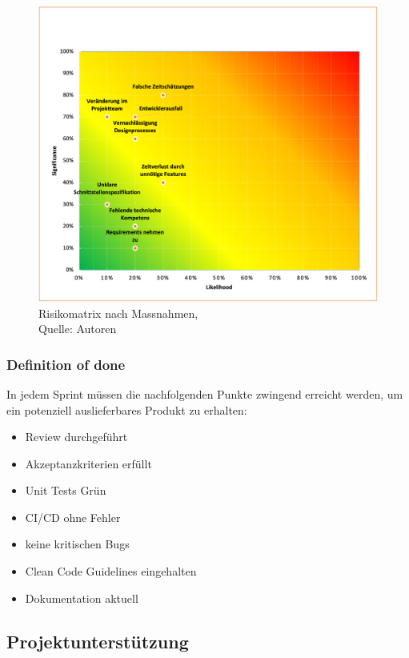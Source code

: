 \begin{figure}[H]
    \centering
   \includegraphics[width=1\textwidth]{images/RiskMap_naher.png}
    \caption[RisikomatrixNach]{Risikomatrix nach Massnahmen,\\ Quelle: Autoren}
    \label{img: RisikomatrixNachher}
\end{figure}

\subsubsection{Definition of done}
In jedem Sprint müssen die nachfolgenden Punkte zwingend erreicht werden, um ein potenziell auslieferbares Produkt zu erhalten:

\begin{itemize}
\item Review durchgeführt
\item Akzeptanzkriterien erfüllt
\item Unit Tests Grün
\item CI/CD ohne Fehler
\item keine kritischen Bugs
\item Clean Code Guidelines eingehalten
\item Dokumentation aktuell
\end{itemize}
\newpage
\subsection{Projektunterst\"utzung}
